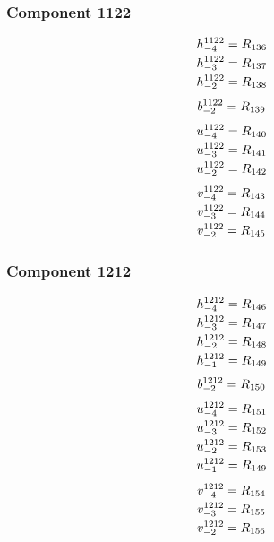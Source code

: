\documentclass[11pt,a4paper]{article}
\begin{document}
\subsubsection{Component 1122}
\begin{equation}
\shortstack[l]{$\displaystyle h^{1122}_{-4}=R_{136}$\\
$\displaystyle h^{1122}_{-3}=R_{137}$\\
$\displaystyle h^{1122}_{-2}=R_{138}$}
\label{eq:cat-map-42}
\end{equation}
\begin{equation}
\shortstack[l]{$\displaystyle b^{1122}_{-2}=R_{139}$}
\label{eq:cat-map-43}
\end{equation}
\begin{equation}
\shortstack[l]{$\displaystyle u^{1122}_{-4}=R_{140}$\\
$\displaystyle u^{1122}_{-3}=R_{141}$\\
$\displaystyle u^{1122}_{-2}=R_{142}$}
\label{eq:cat-map-44}
\end{equation}
\begin{equation}
\shortstack[l]{$\displaystyle v^{1122}_{-4}=R_{143}$\\
$\displaystyle v^{1122}_{-3}=R_{144}$\\
$\displaystyle v^{1122}_{-2}=R_{145}$}
\label{eq:cat-map-45}
\end{equation}
\subsubsection{Component 1212}
\begin{equation}
\shortstack[l]{$\displaystyle h^{1212}_{-4}=R_{146}$\\
$\displaystyle h^{1212}_{-3}=R_{147}$\\
$\displaystyle h^{1212}_{-2}=R_{148}$\\
$\displaystyle h^{1212}_{-1}=R_{149}$}
\label{eq:cat-map-46}
\end{equation}
\begin{equation}
\shortstack[l]{$\displaystyle b^{1212}_{-2}=R_{150}$}
\label{eq:cat-map-47}
\end{equation}
\begin{equation}
\shortstack[l]{$\displaystyle u^{1212}_{-4}=R_{151}$\\
$\displaystyle u^{1212}_{-3}=R_{152}$\\
$\displaystyle u^{1212}_{-2}=R_{153}$\\
$\displaystyle u^{1212}_{-1}=R_{149}$}
\label{eq:cat-map-48}
\end{equation}
\begin{equation}
\shortstack[l]{$\displaystyle v^{1212}_{-4}=R_{154}$\\
$\displaystyle v^{1212}_{-3}=R_{155}$\\
$\displaystyle v^{1212}_{-2}=R_{156}$}
\label{eq:cat-map-49}
\end{equation}
\end{document}
